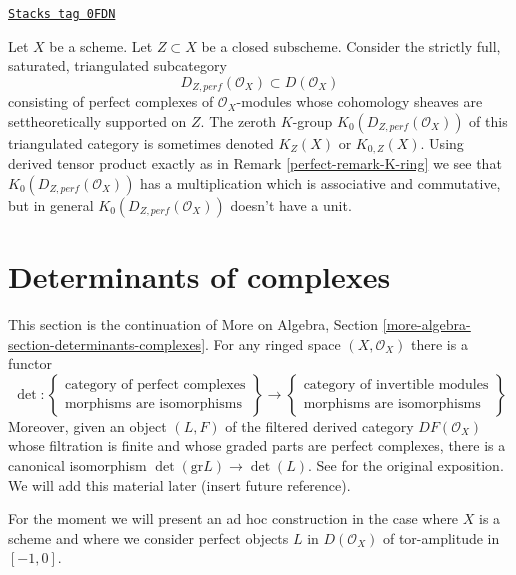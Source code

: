 \begin{remark}[Perf Z]
\label{perfect-remark-perf-Z}
\href{https://stacks.math.columbia.edu/tag/0FDN}{\texttt{Stacks tag 0FDN}}

Let $X$ be a scheme. Let $Z \subset X$ be a closed subscheme. Consider the
strictly full, saturated, triangulated subcategory
$$
D_{Z, perf}(\mathcal{O}_X) \subset D(\mathcal{O}_X)
$$
consisting of perfect complexes of $\mathcal{O}_X$-modules
whose cohomology sheaves are settheoretically supported on $Z$.
The zeroth $K$-group $K_0(D_{Z, perf}(\mathcal{O}_X))$
of this triangulated category is sometimes denoted
$K_Z(X)$ or $K_{0, Z}(X)$. Using derived tensor product exactly
as in Remark \ref{perfect-remark-K-ring} we see that $K_0(D_{Z, perf}(\mathcal{O}_X))$
has a multiplication which is associative and commutative,
but in general $K_0(D_{Z, perf}(\mathcal{O}_X))$ doesn't have a unit.
\end{remark}

\section{Determinants of complexes}
\label{perfect-section-det-two-terms}
This section is the continuation of
More on Algebra, Section \ref{more-algebra-section-determinants-complexes}.
For any ringed space $(X, \mathcal{O}_X)$ there is a functor
$$
\det :
\left\{
\begin{matrix}
\text{category of perfect complexes} \\
\text{morphisms are isomorphisms}
\end{matrix}
\right\}
\longrightarrow
\left\{
\begin{matrix}
\text{category of invertible modules} \\
\text{morphisms are isomorphisms}
\end{matrix}
\right\}
$$
Moreover, given an object $(L, F)$ of the filtered derived category
$DF(\mathcal{O}_X)$ whose filtration is finite and whose graded parts
are perfect complexes, there is a canonical isomorphism
$\det(\text{gr}L) \to \det(L)$. See \cite{determinant} for the
original exposition. We will add this material later (insert future reference).

\medskip\noindent
For the moment we will present an ad hoc construction in the case
where $X$ is a scheme and where we consider perfect objects $L$ in
$D(\mathcal{O}_X)$ of tor-amplitude in $[-1, 0]$.

